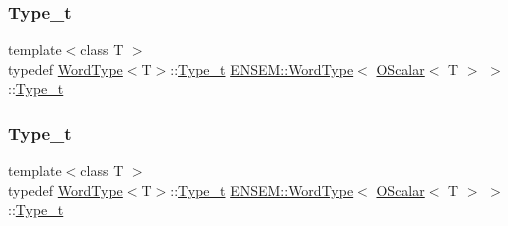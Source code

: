 \subsubsection{\texorpdfstring{Type\_t}{Type\_t}\hspace{0.1cm}{\footnotesize\ttfamily [1/3]}}
{\footnotesize\ttfamily template$<$class T $>$ \\
typedef \mbox{\hyperlink{structENSEM_1_1WordType}{Word\+Type}}$<$T$>$\+::\mbox{\hyperlink{structENSEM_1_1WordType_3_01OScalar_3_01T_01_4_01_4_a8fa9533e78185900519355e6b5dc8ab5}{Type\+\_\+t}} \mbox{\hyperlink{structENSEM_1_1WordType}{E\+N\+S\+E\+M\+::\+Word\+Type}}$<$ \mbox{\hyperlink{classENSEM_1_1OScalar}{O\+Scalar}}$<$ T $>$ $>$\+::\mbox{\hyperlink{structENSEM_1_1WordType_3_01OScalar_3_01T_01_4_01_4_a8fa9533e78185900519355e6b5dc8ab5}{Type\+\_\+t}}}

\mbox{\label{structENSEM_1_1WordType_3_01OScalar_3_01T_01_4_01_4_a8fa9533e78185900519355e6b5dc8ab5}} 
\subsubsection{\texorpdfstring{Type\_t}{Type\_t}\hspace{0.1cm}{\footnotesize\ttfamily [2/3]}}
{\footnotesize\ttfamily template$<$class T $>$ \\
typedef \mbox{\hyperlink{structENSEM_1_1WordType}{Word\+Type}}$<$T$>$\+::\mbox{\hyperlink{structENSEM_1_1WordType_3_01OScalar_3_01T_01_4_01_4_a8fa9533e78185900519355e6b5dc8ab5}{Type\+\_\+t}} \mbox{\hyperlink{structENSEM_1_1WordType}{E\+N\+S\+E\+M\+::\+Word\+Type}}$<$ \mbox{\hyperlink{classENSEM_1_1OScalar}{O\+Scalar}}$<$ T $>$ $>$\+::\mbox{\hyperlink{structENSEM_1_1WordType_3_01OScalar_3_01T_01_4_01_4_a8fa9533e78185900519355e6b5dc8ab5}{Type\+\_\+t}}}

\mbox{\label{structENSEM_1_1WordType_3_01OScalar_3_01T_01_4_01_4_a8fa9533e78185900519355e6b5dc8ab5}} 

